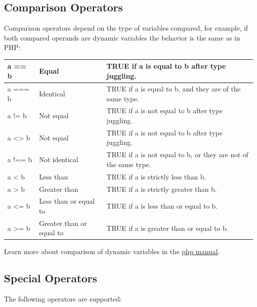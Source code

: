 \documentclass[letterpaper,10pt,english]{sphinxmanual}
\begin{document}
\subsection{Comparison Operators}
\label{operators:comparison-operators}
Comparison operators depend on the type of variables compared, for example, if both
compared operands are dynamic variables the behavior is the same as in PHP:

\begin{tabulary}{\linewidth}{|L|L|L|}
\hline

a == b
 & 
Equal
 & 
TRUE if a is equal to b after type juggling.
\\\hline

a === b
 & 
Identical
 & 
TRUE if a is equal to b, and they are of the same type.
\\\hline

a != b
 & 
Not equal
 & 
TRUE if a is not equal to b after type juggling.
\\\hline

a \textless{}\textgreater{} b
 & 
Not equal
 & 
TRUE if a is not equal to b after type juggling.
\\\hline

a !== b
 & 
Not identical
 & 
TRUE if a is not equal to b, or they are not of the same type.
\\\hline

a \textless{} b
 & 
Less than
 & 
TRUE if a is strictly less than b.
\\\hline

a \textgreater{} b
 & 
Greater than
 & 
TRUE if a is strictly greater than b.
\\\hline

a \textless{}= b
 & 
Less than or equal to
 & 
TRUE if a is less than or equal to b.
\\\hline

a \textgreater{}= b
 & 
Greater than or equal to
 & 
TRUE if a is greater than or equal to b.
\\\hline
\end{tabulary}


Learn more about comparison of dynamic variables in the \href{http://www.php.net/manual/en/language.operators.comparison.php}{php manual}.


\subsection{Special Operators}
\label{operators:special-operators}
The following operators are supported:
\end{document}

